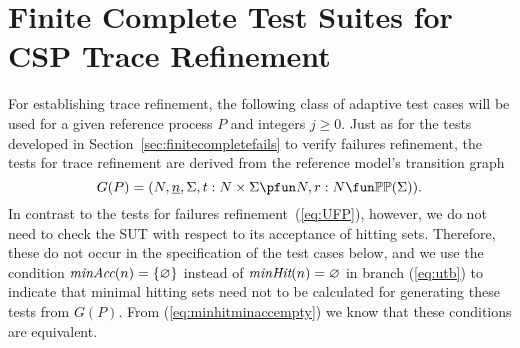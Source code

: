 \section{Finite Complete Test Suites for CSP Trace Refinement}
\label{sec:finitecomplete}

For establishing trace refinement, the following class of adaptive test cases
will be used for a given reference process $P$ and  integers $j \ge 0$.
Just as for the tests developed  in
Section~\ref{sec:finitecompletefails} to verify failures refinement,
the tests for trace refinement are
derived from the reference model's transition graph
$$
G(P) = ( N, \ii n, \Sigma, t : N\times\Sigma \pfun N, r : N \fun \mathbb{P}\mathbb{P}(\Sigma)).
$$
In contrast to the tests for failures refinement~(\ref{eq:UFP}), however, we
do not need to check the SUT with respect to its acceptance of hitting sets.
Therefore, these do not occur in the specification of the test cases below,
and we use the condition $\text{\it minAcc}(n) = \{ \varnothing \}$ instead of
$\text{\it minHit}(n) = \varnothing$ in branch (\ref{eq:utb}) 
to indicate that minimal hitting sets need not to
be calculated for generating these tests from $G(P)$. From
(\ref{eq:minhitminaccempty}) we know that these conditions are equivalent.



